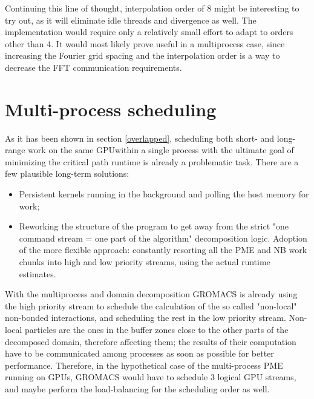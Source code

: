 \documentclass[12pt,a4paper]{report}
\newcommand{\draft}[1]{#1}
\begin{document}
Continuing this line of thought, interpolation order of 8 might be interesting to try out, as it will eliminate idle threads and divergence as well. The implementation would require only a relatively small effort to adapt to orders other than 4. It would most likely prove useful in a multiprocess case, since increasing the Fourier grid spacing and the interpolation order is a way to decrease the FFT communication requirements.

\section{Multi-process scheduling}

As it has been shown in section \ref{overlapped}, scheduling both short- and long-range work on the same GPU\draft{within a single process} with the ultimate goal of minimizing the critical path runtime is already a problematic task.
There are a few plausible long-term solutions: 
\begin{itemize}
\item Persistent kernels running in the background and polling the host memory for work;
\item Reworking the structure of the program to get away from the strict "one command stream = one part of the algorithm" decomposition logic. Adoption of the more flexible approach: constantly resorting all the PME and NB work chunks into high and low priority streams, using the actual runtime estimates.
\end{itemize}
With the multiprocess and domain decomposition GROMACS is already using the high priority stream to schedule the calculation of the so called "non-local" non-bonded interactions, and scheduling the rest in the low priority stream. Non-local particles are the ones in the buffer zones close to the other parts of the decomposed domain, therefore affecting them; the results of their computation have to be communicated among processes as soon as possible for better performance.
Therefore, in the hypothetical case of the multi-process PME running on GPUs, GROMACS would have to schedule 3 logical GPU streams, and maybe perform the load-balancing for the scheduling order as well.  

\end{document}
